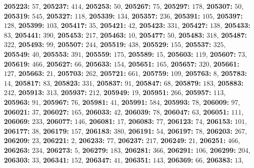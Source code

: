 \textsf{\bfseries 205223:} $57$, \textsf{\bfseries 205237:} $414$, \textsf{\bfseries 205253:} $50$, \textsf{\bfseries 205267:} $75$, \textsf{\bfseries 205297:} $178$, \textsf{\bfseries 205307:} $50$, \textsf{\bfseries 205319:} $545$, \textsf{\bfseries 205327:} $118$, \textsf{\bfseries 205339:} $134$, \textsf{\bfseries 205357:} $236$, \textsf{\bfseries 205391:} $105$, \textsf{\bfseries 205397:} $128$, \textsf{\bfseries 205399:} $103$, \textsf{\bfseries 205417:} $35$, \textsf{\bfseries 205421:} $42$, \textsf{\bfseries 205423:} $331$, \textsf{\bfseries 205427:} $138$, \textsf{\bfseries 205433:} $83$, \textsf{\bfseries 205441:} $390$, \textsf{\bfseries 205453:} $217$, \textsf{\bfseries 205463:} $10$, \textsf{\bfseries 205477:} $50$, \textsf{\bfseries 205483:} $318$, \textsf{\bfseries 205487:} $322$, \textsf{\bfseries 205493:} $99$, \textsf{\bfseries 205507:} $244$, \textsf{\bfseries 205519:} $438$, \textsf{\bfseries 205529:} $155$, \textsf{\bfseries 205537:} $325$, \textsf{\bfseries 205549:} $40$, \textsf{\bfseries 205553:} $391$, \textsf{\bfseries 205559:} $175$, \textsf{\bfseries 205589:} $15$, \textsf{\bfseries 205603:} $119$, \textsf{\bfseries 205607:} $73$, \textsf{\bfseries 205619:} $466$, \textsf{\bfseries 205627:} $66$, \textsf{\bfseries 205633:} $154$, \textsf{\bfseries 205651:} $165$, \textsf{\bfseries 205657:} $320$, \textsf{\bfseries 205661:} $127$, \textsf{\bfseries 205663:} $21$, \textsf{\bfseries 205703:} $262$, \textsf{\bfseries 205721:} $661$, \textsf{\bfseries 205759:} $109$, \textsf{\bfseries 205763:} $8$, \textsf{\bfseries 205783:} $14$, \textsf{\bfseries 205817:} $83$, \textsf{\bfseries 205823:} $331$, \textsf{\bfseries 205837:} $91$, \textsf{\bfseries 205847:} $68$, \textsf{\bfseries 205879:} $183$, \textsf{\bfseries 205883:} $242$, \textsf{\bfseries 205913:} $313$, \textsf{\bfseries 205937:} $212$, \textsf{\bfseries 205949:} $19$, \textsf{\bfseries 205951:} $266$, \textsf{\bfseries 205957:} $113$, \textsf{\bfseries 205963:} $91$, \textsf{\bfseries 205967:} $76$, \textsf{\bfseries 205981:} $41$, \textsf{\bfseries 205991:} $584$, \textsf{\bfseries 205993:} $78$, \textsf{\bfseries 206009:} $97$, \textsf{\bfseries 206021:} $37$, \textsf{\bfseries 206027:} $165$, \textsf{\bfseries 206033:} $42$, \textsf{\bfseries 206039:} $78$, \textsf{\bfseries 206047:} $63$, \textsf{\bfseries 206051:} $111$, \textsf{\bfseries 206069:} $233$, \textsf{\bfseries 206077:} $146$, \textsf{\bfseries 206081:} $17$, \textsf{\bfseries 206083:} $77$, \textsf{\bfseries 206123:} $74$, \textsf{\bfseries 206153:} $101$, \textsf{\bfseries 206177:} $38$, \textsf{\bfseries 206179:} $157$, \textsf{\bfseries 206183:} $380$, \textsf{\bfseries 206191:} $54$, \textsf{\bfseries 206197:} $78$, \textsf{\bfseries 206203:} $267$, \textsf{\bfseries 206209:} $23$, \textsf{\bfseries 206221:} $2$, \textsf{\bfseries 206233:} $77$, \textsf{\bfseries 206237:} $217$, \textsf{\bfseries 206249:} $21$, \textsf{\bfseries 206251:} $466$, \textsf{\bfseries 206263:} $234$, \textsf{\bfseries 206273:} $5$, \textsf{\bfseries 206279:} $183$, \textsf{\bfseries 206281:} $366$, \textsf{\bfseries 206291:} $106$, \textsf{\bfseries 206299:} $204$, \textsf{\bfseries 206303:} $33$, \textsf{\bfseries 206341:} $152$, \textsf{\bfseries 206347:} $41$, \textsf{\bfseries 206351:} $143$, \textsf{\bfseries 206369:} $66$, \textsf{\bfseries 206383:} $13$, 
